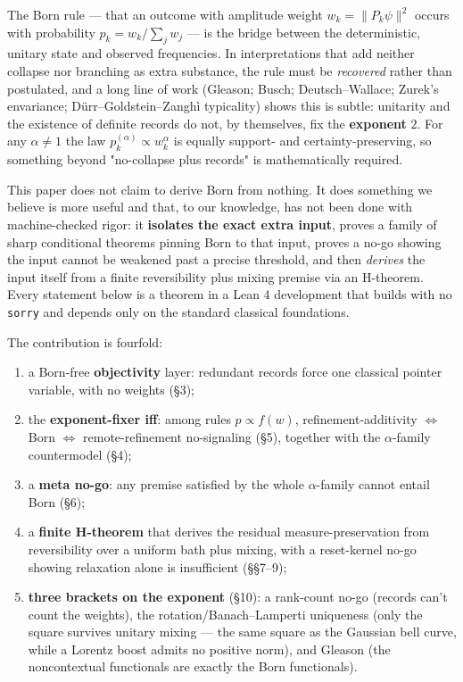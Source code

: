 \documentclass[11pt,a4paper]{article}
\begin{document}
The Born rule — that an outcome with amplitude weight $w_k=\lVert P_k\psi\rVert^2$ occurs with probability
$p_k=w_k/\sum_j w_j$ — is the bridge between the deterministic, unitary state and observed frequencies. In
interpretations that add neither collapse nor branching as extra substance, the rule must be \emph{recovered}
rather than postulated, and a long line of work (Gleason; Busch; Deutsch–Wallace; Zurek's envariance;
Dürr–Goldstein–Zanghì typicality) shows this is subtle: unitarity and the existence of definite records do
not, by themselves, fix the \textbf{exponent} $2$. For any $\alpha\neq 1$ the law $p_k^{(\alpha)}\propto w_k^{\alpha}$ is equally support- and certainty-preserving, so something beyond "no-collapse plus records"
is mathematically required.

This paper does not claim to derive Born from nothing. It does something we believe is more useful and that,
to our knowledge, has not been done with machine-checked rigor: it \textbf{isolates the exact extra input},
proves a family of sharp conditional theorems pinning Born to that input, proves a no-go showing the input
cannot be weakened past a precise threshold, and then \emph{derives} the input itself from a finite reversibility
plus mixing premise via an H-theorem. Every statement below is a theorem in a Lean 4 development that builds
with no \texttt{sorry} and depends only on the standard classical foundations.

The contribution is fourfold:

\begin{enumerate}
  \item a Born-free \textbf{objectivity} layer: redundant records force one classical pointer variable, with no weights (§3);
  \item the \textbf{exponent-fixer iff}: among rules $p\propto f(w)$, refinement-additivity $\Leftrightarrow$ Born $\Leftrightarrow$ remote-refinement no-signaling (§5), together with the $\alpha$-family countermodel (§4);
  \item a \textbf{meta no-go}: any premise satisfied by the whole $\alpha$-family cannot entail Born (§6);
  \item a \textbf{finite H-theorem} that derives the residual measure-preservation from reversibility over a uniform bath plus mixing, with a reset-kernel no-go showing relaxation alone is insufficient (§§7–9);
  \item \textbf{three brackets on the exponent} (§10): a rank-count no-go (records can't count the weights), the rotation/Banach–Lamperti uniqueness (only the square survives unitary mixing — the same square as the Gaussian bell curve, while a Lorentz boost admits no positive norm), and Gleason (the noncontextual functionals are exactly the Born functionals).
\end{enumerate}
\end{document}
